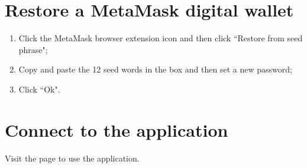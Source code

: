 \documentclass[ManualeUtente.tex]{subfiles}
\begin{document}
\section{Restore a MetaMask digital wallet}
\begin{enumerate}
	\item Click the MetaMask browser extension icon and then click \textquotedblleft Restore from seed phrase";
	\item Copy and paste the 12 seed words in the box and then set a new password;
	\item Click \textquotedblleft Ok".
\end{enumerate}

\section{Connect to the application}
Visit the page  to use the application. %
\end{document}
